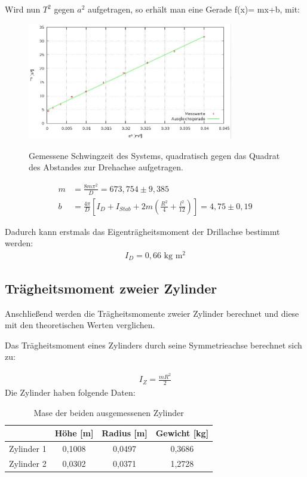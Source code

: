 Wird nun $T^2$ gegen $a^2$ aufgetragen, so erhält man eine Gerade f(x)= mx+b, mit:
\begin{figure}[htbp]
\includegraphics[width=0.8\textwidth]{pics/eigentr.jpg}
\label{pic_plot}
\caption{Gemessene Schwingzeit des Systems, quadratisch gegen das Quadrat des Abstandes zur Drehachse aufgetragen.}

\end{figure}
\begin{align*}
 m&=\frac{8m\pi^2}{D}=673,754 \pm 9,385\\
b&=\frac{4\pi}{D}  \left[  I_D+I_{Stab}+2m\left(\frac{R^2}{4}+\frac{l^2}{12}\right)\right]=4,75 \pm 0,19
\end{align*}

Dadurch kann erstmals das Eigenträgheitsmoment der Drillachse bestimmt werden:
\begin{align*}
I_D=0,66  \text{ kg m$^2$}
\end{align*}

\subsection{Trägheitsmoment zweier Zylinder}
Anschließend werden die Trägheitsmomente zweier Zylinder berechnet und diese mit den theoretischen Werten verglichen.

Das Trägheitsmoment eines Zylinders durch seine Symmetrieachse berechnet sich zu:

\begin{align}
I_{Z}=\frac{mR^2}{2}
\label{eq_Izyl}
\end{align}
\newpage
Die Zylinder haben folgende Daten:
\begin{table}[H]
\begin{tabular}{|c|c|c|c|}
\hline 
 & Höhe [m] & Radius [m] & Gewicht [kg]\\ 
\hline 
Zylinder 1 & 0,1008 & 0,0497 & 0,3686 \\ 
\hline 
Zylinder 2 & 0,0302 & 0,0371 & 1,2728 \\ 
\hline 
\end{tabular} 
\caption{Mase der beiden ausgemessenen Zylinder}
\end{table}

